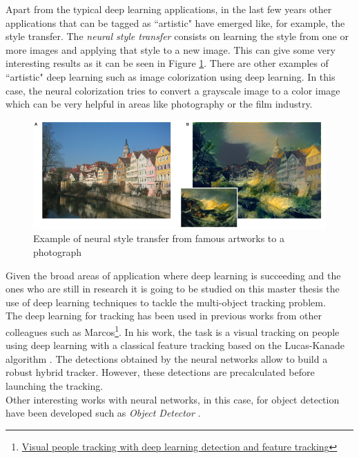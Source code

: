 Apart from the typical deep learning applications, in the last few years other applications that can be tagged as ``artistic" have emerged like, for example, the style transfer. The \textit{neural style transfer} consists on learning the style from one or more images and applying that style to a new image. This can give some very interesting results as it can be seen in Figure \ref{style_transfer}. There are other examples of ``artistic" deep learning such as image colorization using deep learning. In this case, the neural colorization tries to convert a grayscale image to a color image which can be very helpful in areas like photography or the film industry.
\begin{figure}[H]
\begin{center}
\includegraphics[scale=0.4]{figures/style_transfer.png}
\caption{Example of neural style transfer from famous artworks to a photograph \cite{gatys2015neural}}
\label{style_transfer}
\end{center}
\end{figure}
Given the broad areas of application where deep learning is succeeding and the ones who are still in research it is going to be studied on this master thesis the use of deep learning techniques to tackle the multi-object tracking problem.\\
The deep learning for tracking has been used in previous works from other colleagues such as Marcos\footnote{\href{https://gsyc.urjc.es/jmplaza/students/tfm-visualtracking-marcos_pieras-2017.pdf}{Visual people tracking with deep learning
detection and feature tracking}}. In his work, the task is a visual tracking on people using deep learning with a classical feature tracking based on the Lucas-Kanade algorithm \cite{baker2004lucas}. The detections obtained by the neural networks allow to build a robust hybrid tracker. However, these detections are precalculated before launching the tracking.\\
Other interesting works with neural networks, in this case, for object detection have been developed such as \textit{Object Detector} \cite{condes2018person}.
